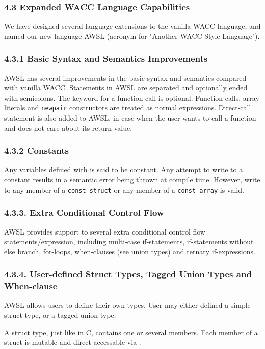 \documentclass[10pt,a4paper]{report}
\begin{document}
  \subsubsection*{4.3 Expanded WACC Language Capabilities}
  We have designed several language extensions to the vanilla WACC language, and
  named our new language AWSL (acronym for "Another WACC-Style Language").

  \subsubsection*{4.3.1 Basic Syntax and Semantics Improvements}
  AWSL has several improvements in the basic syntax and semantics compared with
  vanilla WACC. Statements in AWSL are separated and optionally ended with
  semicolons. The  keyword for a function call is optional.
  Function calls, array literals and \texttt{newpair} constructors are treated
  as normal expressions. Direct-call statement is also added to AWSL, in case
  when the user wants to call a function and does not
  care about its return value.

  \subsubsection*{4.3.2 Constants}
  Any variables defined with  is said to be constant. Any attempt
  to write to a constant results in a semantic error being thrown at compile
  time. However, write to any member of a \texttt{const struct} or any member of
  a \texttt{const array} is valid. 

  \subsubsection*{4.3.3. Extra Conditional Control Flow}
  AWSL provides support to several extra conditional control flow
  statements/expression, including multi-case if-statements, if-statements
  without else branch, for-loops, when-clauses (see union types) and ternary
  if-expressions. 

  \subsubsection*{4.3.4. User-defined Struct Types, Tagged Union Types and When-clause}
  AWSL allows users to define their own types. User may either defined a simple
  struct type, or a tagged union type.

  A struct type, just like  in C, contains one or several
  members. Each member of a struct is mutable and direct-accessable via
  .
\end{document}
